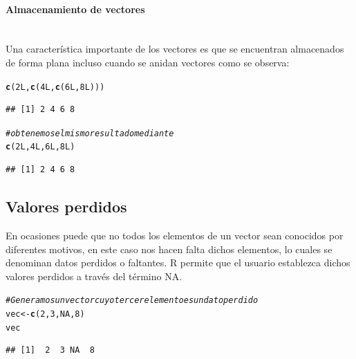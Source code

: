 \documentclass[11pt,a4paper,oneside]{book}\usepackage[]{graphicx}\usepackage[]{color}
\makeatletter
\newcommand{\hlnum}[1]{\textcolor[rgb]{0.686,0.059,0.569}{#1}}%
\newcommand{\hlcom}[1]{\textcolor[rgb]{0.678,0.584,0.686}{\textit{#1}}}%
\newcommand{\hlstd}[1]{\textcolor[rgb]{0.345,0.345,0.345}{#1}}%
\newcommand{\hlkwb}[1]{\textcolor[rgb]{0.69,0.353,0.396}{#1}}%
\newcommand{\hlkwd}[1]{\textcolor[rgb]{0.737,0.353,0.396}{\textbf{#1}}}%
\newenvironment{kframe}{%
 \def\at@end@of@kframe{}%
 \ifinner\ifhmode%
  \def\at@end@of@kframe{\end{minipage}}%
  \begin{minipage}{\columnwidth}%
 \fi\fi%
 \def\FrameCommand##1{\hskip\@totalleftmargin \hskip-\fboxsep
 \colorbox{shadecolor}{##1}\hskip-\fboxsep
     \hskip-\linewidth \hskip-\@totalleftmargin \hskip\columnwidth}%
 \MakeFramed {\advance\hsize-\width
   \@totalleftmargin\z@ \linewidth\hsize
   \@setminipage}}%
 {\par\unskip\endMakeFramed%
 \at@end@of@kframe}
\newenvironment{knitrout}{}{} %
\makeatother
\begin{document}
\begin{itemize}
\paragraph{Almacenamiento de vectores}
~\\

Una característica importante de los vectores es que se encuentran almacenados de forma plana incluso cuando se anidan vectores como se observa:
\begin{knitrout}
\color{fgcolor}\begin{kframe}
\begin{alltt}
\hlkwd{c}\hlstd{(}\hlnum{2L}\hlstd{,} \hlkwd{c}\hlstd{(}\hlnum{4L}\hlstd{,} \hlkwd{c}\hlstd{(}\hlnum{6L}\hlstd{,} \hlnum{8L}\hlstd{)))}
\end{alltt}
\begin{verbatim}
## [1] 2 4 6 8
\end{verbatim}
\begin{alltt}
\hlcom{# obtenemos el mismo resultado mediante}
\hlkwd{c}\hlstd{(}\hlnum{2L}\hlstd{,} \hlnum{4L}\hlstd{,} \hlnum{6L}\hlstd{,} \hlnum{8L}\hlstd{)}
\end{alltt}
\begin{verbatim}
## [1] 2 4 6 8
\end{verbatim}
\end{kframe}
\end{knitrout}

\subsection{Valores perdidos}

En ocasiones puede que no todos los elementos de un vector sean conocidos por diferentes motivos, en este caso nos hacen falta dichos elementos, lo cuales se denominan datos perdidos o faltantes. R permite que el usuario establezca dichos valores perdidos a través del término NA.
\begin{knitrout}
\color{fgcolor}\begin{kframe}
\begin{alltt}
\hlcom{#Generamos un vector cuyo tercer elemento es un dato perdido}
\hlstd{vec} \hlkwb{<-} \hlkwd{c}\hlstd{(}\hlnum{2}\hlstd{,} \hlnum{3}\hlstd{,} \hlnum{NA}\hlstd{,} \hlnum{8}\hlstd{)}
\hlstd{vec}
\end{alltt}
\begin{verbatim}
## [1]  2  3 NA  8
\end{verbatim}
\end{kframe}
\end{knitrout}


\end{itemize}
\end{document}
